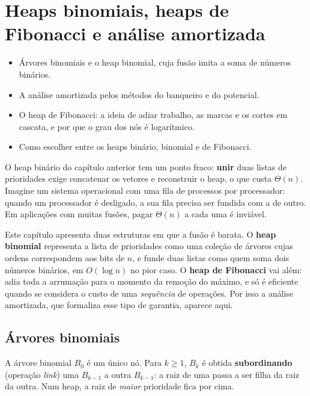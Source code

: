 \chapter{Heaps binomiais, heaps de Fibonacci e análise amortizada}\label{cap:heapav}\label{sec:heapav}
\begin{objetivos}
\begin{itemize}
  \item Árvores binomiais e o heap binomial, cuja fusão imita a soma de números binários.
  \item A análise amortizada pelos métodos do banqueiro e do potencial.
  \item O heap de Fibonacci: a ideia de adiar trabalho, as marcas e os cortes em cascata, e por que o grau dos nós é logarítmico.
  \item Como escolher entre os heaps binário, binomial e de Fibonacci.
\end{itemize}
\end{objetivos}

O heap binário do capítulo anterior tem um ponto fraco: \textbf{unir} duas listas de prioridades exige concatenar os vetores e reconstruir o heap, o que custa $\Theta(n)$. Imagine um sistema operacional com uma fila de processos por processador: quando um processador é desligado, a sua fila precisa ser fundida com a de outro. Em aplicações com muitas fusões, pagar $\Theta(n)$ a cada uma é inviável.

Este capítulo apresenta duas estruturas em que a fusão é barata. O \textbf{heap binomial} representa a lista de prioridades como uma coleção de árvores cujas ordens correspondem aos bits de $n$, e funde duas listas como quem soma dois números binários, em $O(\log n)$ no pior caso. O \textbf{heap de Fibonacci} vai além: adia toda a arrumação para o momento da remoção do máximo, e só é eficiente quando se considera o custo de uma \emph{sequência} de operações. Por isso a análise amortizada, que formaliza esse tipo de garantia, aparece aqui.

\section{Árvores binomiais}\label{sec:binomial}
\begin{defi}
A árvore binomial $B_0$ é um único nó. Para $k\ge1$, $B_k$ é obtida \textbf{subordinando} (operação \emph{link}) uma $B_{k-1}$ a outra $B_{k-1}$: a raiz de uma passa a ser filha da raiz da outra. Num heap, a raiz de \emph{maior} prioridade fica por cima.
\end{defi}

